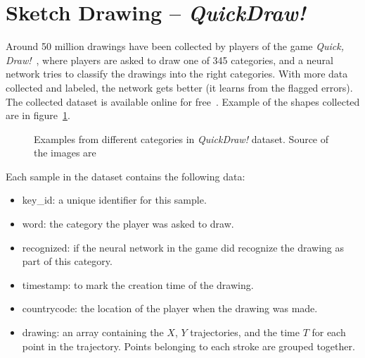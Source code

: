 \section{Sketch Drawing -- \textit{QuickDraw!}}
\par Around 50 million drawings have been collected by players of the game \textit{Quick, Draw!}~\citep{quickdrawgame}, where players are asked to draw one of 345 categories, and a neural network tries to classify the drawings into the right categories. With more data collected and labeled, the network gets better (it learns from the flagged errors). The collected dataset is available online for free~\citep{quickdraw}. Example of the shapes collected are in figure~\ref{fig:quickdraw_preview}.

\begin{figure}
    \centering
    \caption{Examples from different categories in \textit{QuickDraw!} dataset. Source of the images are~\citep{quickdraw}}
    \label{fig:quickdraw_preview}
\end{figure}


\par Each sample in the dataset contains the following data:
\begin{itemize}[noitemsep]
    \item key\_id: a unique identifier for this sample.
    \item word: the category the player was asked to draw.
    \item recognized: if the neural network in the game did recognize the drawing as part of this category.
    \item timestamp: to mark the creation time of the drawing.
    \item countrycode: the location of the player when the drawing was made.
    \item drawing: an array containing the $X$, $Y$ trajectories, and the time $T$ for each point in the trajectory. Points belonging to each stroke are grouped together.
\end{itemize}

